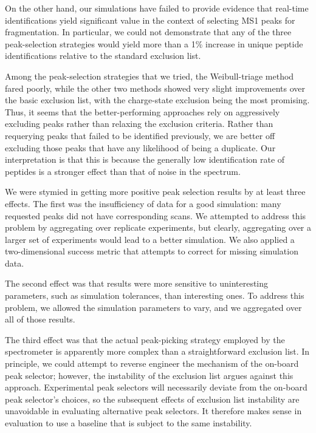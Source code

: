 \documentclass[12pt]{article}
\begin{document}
On the other hand, our simulations have failed to provide evidence that real-time identifications yield significant value in the context of selecting MS1 peaks for fragmentation. In particular, we could not demonstrate that any of the three peak-selection strategies would yield more than a 1\% increase in unique peptide identifications relative to the standard exclusion list.

Among the peak-selection strategies that we tried, 
the Weibull-triage method fared poorly, while the other two
methods showed very slight improvements over the basic exclusion list, with the
charge-state exclusion being the most promising.
Thus, it seems that the
better-performing approaches rely on aggressively excluding peaks rather than
relaxing the exclusion criteria. Rather than requerying peaks that failed to be
identified previously, we are better off excluding those peaks that have any
likelihood of being a duplicate. Our interpretation is that this is because the
generally low identification rate of peptides is a stronger effect than that of
noise in the spectrum.

We were stymied in getting more positive peak selection results by at least three effects. The first was the insufficiency of data for a good simulation: many requested peaks did not have corresponding scans. We attempted to address this problem by aggregating over replicate experiments, but clearly, aggregating over a larger set of experiments would lead to a better simulation.  We also applied a two-dimensional success metric that attempts to correct for missing simulation data.

The second effect was that results were more sensitive to uninteresting parameters, such as simulation tolerances, than interesting ones.  To address this problem, we allowed the simulation parameters to vary, and we aggregated over all of those results.

The third effect was that the actual peak-picking strategy employed by the spectrometer is apparently more complex than a straightforward exclusion list. In principle, we could attempt to reverse engineer the mechanism of the on-board peak selector; however, the instability of the exclusion list argues against this approach.  Experimental peak selectors will necessarily deviate from the on-board peak selector's choices, so the subsequent effects of exclusion list instability are unavoidable in evaluating alternative peak selectors. It therefore makes sense in evaluation to use a baseline that is subject to the same instability.



\end{document}
